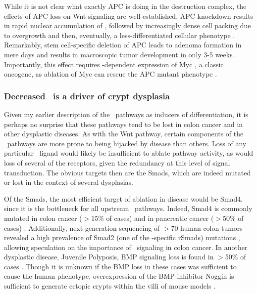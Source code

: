 While it is not clear what exactly APC is doing in the destruction complex,
the effects of APC loss on Wnt signaling are well-established.
APC knockdown results in rapid nuclear accumulation of \bcat, followed by increasingly
dense cell packing due to overgrowth and then, eventually, a less-differentiated
cellular phenotype \cite{Sansom2004}. Remarkably,
stem cell-specific deletion of APC leads to adenoma formation
in mere days and results in macroscopic tumor development in only 3-5 weeks
\cite{Barker2009a}. Importantly, this effect requires
\bcat-dependent expression of Myc \cite{He1998},
a classic oncogene, as ablation of Myc can rescue the APC mutant phenotype \cite{Sansom2007}.


\subsubsection{Decreased \tgfbsf\ is a driver of crypt dysplasia} 


Given my earlier description of the \tgfbsf\ pathways as inducers of differentiation,
it is perhaps no surprise that these pathways tend to be lost in colon cancer
and in other dysplastic diseases. As with the Wnt pathway, certain components of the
\tgfbsf\ pathways are more prone to being hijacked by disease than others.
Loss of any particular \tgfbsf\ ligand would likely be insufficient to ablate pathway
activity, as would loss of several of the receptors, given the redundancy at this
level of signal transduction. The obvious targets then are the Smads, which are indeed
mutated or lost in the context of several dysplasias.


Of the Smads, the most efficient target of ablation in disease would be Smad4,
since it is the bottleneck for all upstream \tgfbsf\
pathways. Indeed, Smad4 is commonly mutated in colon cancer ($>$15\% of cases) and
in pancreatic cancer ($>$50\% of cases) \cite{Levy2005,Seshagiri2012}. Additionally, next-generation
sequencing of $>$70 human colon tumors revealed a high prevalence of Smad2 (one
of the \tgf-specific rSmads)
mutations \cite{Seshagiri2012},
allowing speculation on the importance of \tgf\ signaling in colon cancer.
In another dysplastic
disease, Juvenile Polyposis, BMP signaling loss is found in $>$50\% of cases
\cite{Haramis2004a,Miyazono2005,Hardwick2008}. Though it is unknown if the BMP loss in
these cases was sufficient
to cause the human phenotype, overexpression of the BMP-inhibitor Noggin
is sufficient to generate ectopic crypts within the villi of mouse models \cite{Haramis2004a}.


